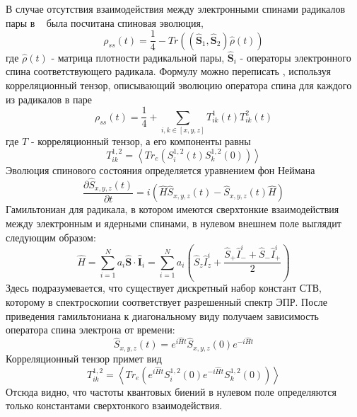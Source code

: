 \documentclass[14pt,titlepage]{extarticle}
\begin{document}
В случае отсутствия взаимодействия между электронными спинами радикалов пары в ~\cite{schulten:3292} была посчитана спиновая эволюция,
\begin{equation} \rho_{ss}(t)=\frac{1}{4}-Tr\left( (\hat{\textbf{S}}_1,\hat{\textbf{S}}_2)\hat\rho(t) \right) \end{equation}
где \( \hat\rho(t) \) - матрица плотности радикальной пары, \( \hat{\textbf{S}}_i \) - операторы электронного спина соответствующего радикала. Формулу можно переписать \cite{knapp:1878}, используя корреляционный тензор, описывающий эволюцию оператора спина для каждого из радикалов в паре
\begin{equation} \rho_{ss}(t)=\frac{1}{4}+ \sum_{i,k\in [x,y,z]} T_{ik}^1(t)T_{ik}^2(t) \end{equation}
где \(T\) - корреляционный тензор, а его компоненты равны
\begin{equation} T_{ik}^{1,2}=\left\langle Tr_e \left(S_i^{1,2}(t)S_k^{1,2}(0) \right) \right\rangle \end{equation}
Эволюция спинового состояния определяется уравнением фон Неймана
\begin{equation} \frac{\partial \hat{S}_{x,y,z} (t)}{\partial t}=i\left (\hat{H}\hat{S}_{x,y,z}(t)-\hat{S}_{x,y,z}(t)\hat{H} \right ) \end{equation}
Гамильтониан для радикала, в котором имеются сверхтонкие взаимодействия между электронным и ядерными спинами, в нулевом внешнем поле выглядит следующим образом:
\begin{equation} \hat H =\sum_{i=1}^{N}  a_i \hat{\textbf{S}} \cdot \hat{\textbf{I}}_i=\sum_{i=1}^{N} a_i \left (\hat {S}_z \hat{I}_z^i+\frac{\hat{S}_+ \hat{I}_-^{i}+\hat{S}_- \hat{I}_+^{i}}{2} \right )  \end{equation}
Здесь подразумевается, что существует дискретный набор констант СТВ, которому в спектроскопии соответствует разрешенный спектр ЭПР. После приведения гамильтониана к диагональному виду получаем зависимость оператора спина электрона от времени:
\begin{equation} \hat{S}_{x,y,z}(t)=e^{i\hat{H}t} \hat{S}_{x,y,z}(0)e^{-i\hat{H}t} \end{equation}
Корреляционный тензор примет вид
\begin{equation} T_{ik}^{1,2}=\left\langle Tr_e \left (e^{i\hat{H}t} S_{i}^{1,2}(0)e^{-i\hat{H}t}S_k^{1,2}(0) \right) \right\rangle \end{equation}
Отсюда видно, что частоты квантовых биений в нулевом поле определяются только константами сверхтонкого взаимодействия.
\end{document}
